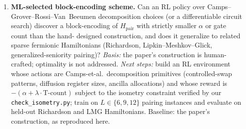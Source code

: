 \begin{enumerate}
\item \textbf{ML-selected block-encoding scheme.}
Can an RL policy over Camps--Grover--Rossi--Van~Beeumen decomposition choices
(or a differentiable circuit search) discover a block-encoding of
$H_{\text{pair}}$ with strictly smaller $\alpha$ or gate count than the hand-
designed construction, and does it generalize to related sparse fermionic
Hamiltonians (Richardson, Lipkin--Meshkov--Glick, generalized-seniority
pairing)?
\emph{Basis:} the paper's construction is human-crafted; optimality is not
addressed.
\emph{Next steps:} build an RL environment whose actions are Camps-et-al.\
decomposition primitives (controlled-swap patterns, diffusion register sizes,
ancilla allocations) and whose reward is
$-(\alpha + \lambda\cdot \text{T-count})$ subject to the isometry constraint
verified by our \texttt{check\_isometry.py}; train on $L\in\{6,9,12\}$
pairing instances and evaluate on held-out Richardson and LMG Hamiltonians.
Baseline: the paper's construction, as reproduced here.
\end{enumerate}
